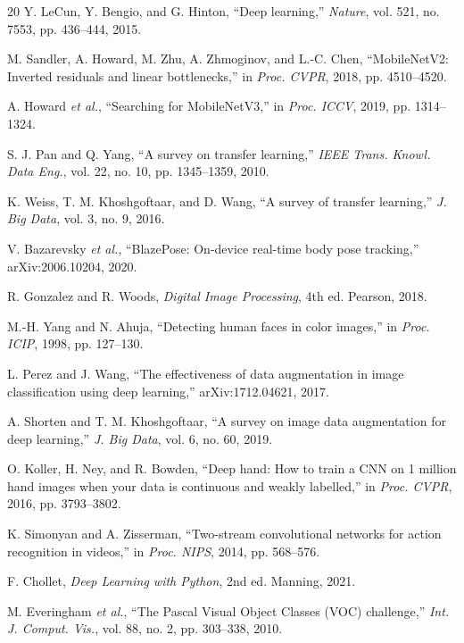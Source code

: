 \documentclass[conference]{IEEEtran}
\begin{document}
\begin{thebibliography}{20}
Y. LeCun, Y. Bengio, and G. Hinton, ``Deep learning,'' \emph{Nature}, vol. 521, no. 7553, pp. 436--444, 2015.

M. Sandler, A. Howard, M. Zhu, A. Zhmoginov, and L.-C. Chen, ``MobileNetV2: Inverted residuals and linear bottlenecks,'' in \emph{Proc. CVPR}, 2018, pp. 4510--4520.

A. Howard \emph{et al.}, ``Searching for MobileNetV3,'' in \emph{Proc. ICCV}, 2019, pp. 1314--1324.

S. J. Pan and Q. Yang, ``A survey on transfer learning,'' \emph{IEEE Trans. Knowl. Data Eng.}, vol. 22, no. 10, pp. 1345--1359, 2010.

K. Weiss, T. M. Khoshgoftaar, and D. Wang, ``A survey of transfer learning,'' \emph{J. Big Data}, vol. 3, no. 9, 2016.

V. Bazarevsky \emph{et al.}, ``BlazePose: On-device real-time body pose tracking,'' arXiv:2006.10204, 2020.

R. Gonzalez and R. Woods, \emph{Digital Image Processing}, 4th ed. Pearson, 2018.

M.-H. Yang and N. Ahuja, ``Detecting human faces in color images,'' in \emph{Proc. ICIP}, 1998, pp. 127--130.

L. Perez and J. Wang, ``The effectiveness of data augmentation in image classification using deep learning,'' arXiv:1712.04621, 2017.

A. Shorten and T. M. Khoshgoftaar, ``A survey on image data augmentation for deep learning,'' \emph{J. Big Data}, vol. 6, no. 60, 2019.

O. Koller, H. Ney, and R. Bowden, ``Deep hand: How to train a CNN on 1 million hand images when your data is continuous and weakly labelled,'' in \emph{Proc. CVPR}, 2016, pp. 3793--3802.

K. Simonyan and A. Zisserman, ``Two-stream convolutional networks for action recognition in videos,'' in \emph{Proc. NIPS}, 2014, pp. 568--576.

F. Chollet, \emph{Deep Learning with Python}, 2nd ed. Manning, 2021.

M. Everingham \emph{et al.}, ``The Pascal Visual Object Classes (VOC) challenge,'' \emph{Int. J. Comput. Vis.}, vol. 88, no. 2, pp. 303--338, 2010.


\end{thebibliography}
\end{document}
